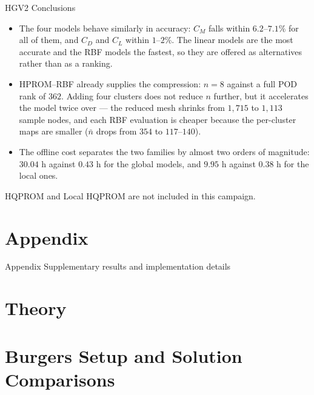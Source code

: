\documentclass[aspectratio=169]{beamer}
\begin{document}
\begin{frame}{HGV2 Conclusions}
\small
\begin{itemize}
  \item The four models behave similarly in accuracy: $C_M$ falls within
        $6.2$--$7.1\%$ for all of them, and $C_D$ and $C_L$ within $1$--$2\%$. The linear
        models are the most accurate and the RBF models the fastest, so they are offered
        as alternatives rather than as a ranking.
  \item HPROM--RBF already supplies the compression: $n=8$ against a full POD rank of
        $362$. Adding four clusters does not reduce $n$ further, but it accelerates the
        model twice over --- the reduced mesh shrinks from $1{,}715$ to $1{,}113$ sample
        nodes, and each RBF evaluation is cheaper because the per-cluster maps are smaller
        ($\bar{n}$ drops from $354$ to $117$--$140$).
  \item The offline cost separates the two families by almost two orders of magnitude:
        $30.04$ h against $0.43$ h for the global models, and $9.95$ h against $0.38$ h
        for the local ones.
\end{itemize}

\vspace{0.3em}
{\footnotesize HQPROM and Local HQPROM are not included in this campaign.}
\end{frame}

\appendix

\section{Appendix}

\begin{frame}{Appendix}
\centering
\Large Supplementary results and implementation details
\end{frame}

\section{Theory}
\BurgersTheoryFrames

\section{Burgers Setup and Solution Comparisons}
\end{document}
